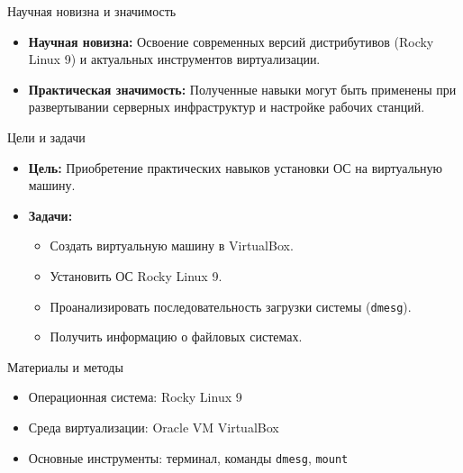 \documentclass[
  ignorenonframetext,
  aspectratio=169,
  russian,
]{beamer}
\providecommand{\tightlist}{%
  \setlength{\itemsep}{0pt}\setlength{\parskip}{0pt}}
\begin{document}
\begin{frame}{Научная новизна и значимость}
\protect{}\label{ux43dux430ux443ux447ux43dux430ux44f-ux43dux43eux432ux438ux437ux43dux430-ux438-ux437ux43dux430ux447ux438ux43cux43eux441ux442ux44c}
\begin{itemize}
\tightlist
\item
  \textbf{Научная новизна:} Освоение современных версий дистрибутивов
  (Rocky Linux 9) и актуальных инструментов виртуализации.
\item
  \textbf{Практическая значимость:} Полученные навыки могут быть
  применены при развертывании серверных инфраструктур и настройке
  рабочих станций.
\end{itemize}
\end{frame}

\begin{frame}[fragile]{Цели и задачи}
\protect{}\label{ux446ux435ux43bux438-ux438-ux437ux430ux434ux430ux447ux438}
\begin{itemize}
\tightlist
\item
  \textbf{Цель:} Приобретение практических навыков установки ОС на
  виртуальную машину.
\item
  \textbf{Задачи:}

  \begin{itemize}
  \tightlist
  \item
    Создать виртуальную машину в VirtualBox.
  \item
    Установить ОС Rocky Linux 9.
  \item
    Проанализировать последовательность загрузки системы
    (\texttt{dmesg}).
  \item
    Получить информацию о файловых системах.
  \end{itemize}
\end{itemize}
\end{frame}

\begin{frame}[fragile]{Материалы и методы}
\protect{}\label{ux43cux430ux442ux435ux440ux438ux430ux43bux44b-ux438-ux43cux435ux442ux43eux434ux44b}
\begin{itemize}
\tightlist
\item
  Операционная система: Rocky Linux 9
\item
  Среда виртуализации: Oracle VM VirtualBox
\item
  Основные инструменты: терминал, команды \texttt{dmesg}, \texttt{mount}
\end{itemize}
\end{frame}
\end{document}
